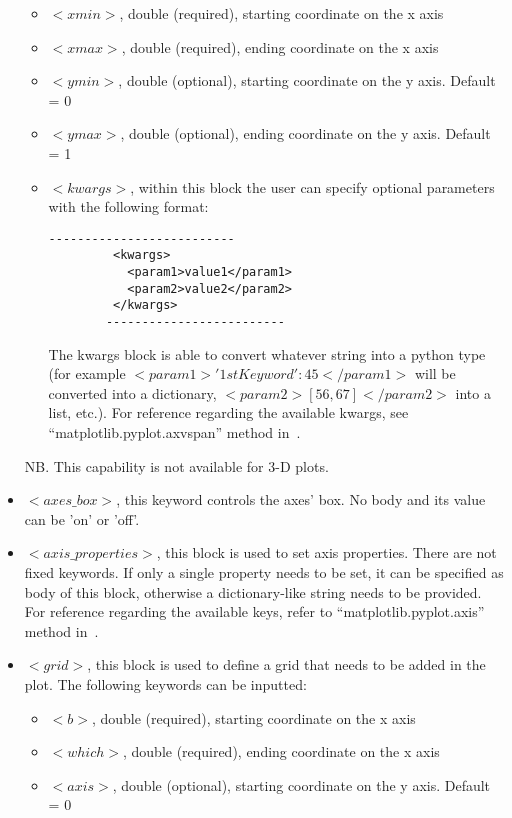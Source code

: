 \begin{itemize}
    \begin{itemize}
        \item \textit{$<xmin>$}, double (required), starting coordinate on the x axis
        \item \textit{$<xmax>$}, double (required), ending coordinate on the x axis
        \item \textit{$<ymin>$}, double (optional), starting coordinate on the y axis. Default = 0
        \item \textit{$<ymax>$}, double (optional), ending coordinate on the y axis. Default = 1
        \item \textit{$<kwargs>$},  within this block the user can specify optional parameters with the following format:
        \begin{lstlisting}[style=XML]
        --------------------------
         <kwargs>
           <param1>value1</param1>
           <param2>value2</param2>
         </kwargs>
        -------------------------
       \end{lstlisting}
         The kwargs block is able to convert whatever string into a python type (for example $<param1>{'1stKeyword':45}</param1>$ will be converted into a dictionary, $<param2>[56,67]</param2>$ into a list, etc.). For reference regarding the available kwargs, see ``matplotlib.pyplot.axvspan'' method in~\cite{MatPlotLib}.
      \end{itemize}
 NB. This capability is not available  for 3-D plots.
\item $<axes\_box>$, this keyword controls the axes' box. No body and its value can be 'on' or 'off'.
\item $<axis\_properties>$, this block is used to set axis properties. There are not fixed keywords. If only a single property needs to be set, it can be specified as body of this block, otherwise a dictionary-like string needs to be provided. For reference regarding the available keys, refer to ``matplotlib.pyplot.axis'' method in~\cite{MatPlotLib}.
\item $<grid>$, this block is used to define a grid that needs to be added in the plot. The following keywords can be inputted:
    \begin{itemize}
        \item \textit{$<b>$}, double (required), starting coordinate on the x axis
        \item \textit{$<which>$}, double (required), ending coordinate on the x axis
        \item \textit{$<axis>$}, double (optional), starting coordinate on the y axis. Default = 0

\end{itemize}
\end{itemize}
